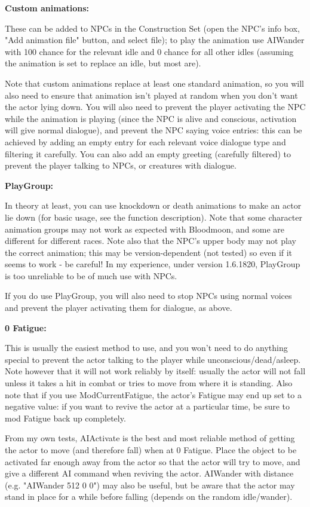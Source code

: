 \textbf{Custom animations:}

These can be added to NPCs in the Construction Set (open the NPC's info
box, "Add animation file" button, and select file); to play the
animation use AIWander with 100 chance for the relevant idle and 0
chance for all other idles (assuming the animation is set to replace an
idle, but most are).

Note that custom animations replace at least one standard animation, so
you will also need to ensure that animation isn't played at random when
you don't want the actor lying down. You will also need to prevent the
player activating the NPC while the animation is playing (since the NPC
is alive and conscious, activation will give normal dialogue), and
prevent the NPC saying voice entries: this can be achieved by adding an
empty entry for each relevant voice dialogue type and filtering it
carefully. You can also add an empty greeting (carefully filtered) to
prevent the player talking to NPCs, or creatures with dialogue.

\textbf{PlayGroup:}

In theory at least, you can use knockdown or death animations to make an
actor lie down (for basic usage, see the function description). Note
that some character animation groups may not work as expected with
Bloodmoon, and some are different for different races. Note also that
the NPC's upper body may not play the correct animation; this may be
version-dependent (not tested) so even if it seems to work - be careful!
In my experience, under version 1.6.1820, PlayGroup is too unreliable to
be of much use with NPCs.

If you do use PlayGroup, you will also need to stop NPCs using normal
voices and prevent the player activating them for dialogue, as above.

\textbf{0 Fatigue:}

This is usually the easiest method to use, and you won't need to do
anything special to prevent the actor talking to the player while
unconscious/dead/asleep. Note however that it will not work reliably by
itself: usually the actor will not fall unless it takes a hit in combat
or tries to move from where it is standing. Also note that if you use
ModCurrentFatigue, the actor's Fatigue may end up set to a negative
value: if you want to revive the actor at a particular time, be sure to
mod Fatigue back up completely.

From my own tests, AIActivate is the best and most reliable method of
getting the actor to move (and therefore fall) when at 0 Fatigue. Place
the object to be activated far enough away from the actor so that the
actor will try to move, and give a different AI command when reviving
the actor. AIWander with distance (e.g. "AIWander 512 0 0") may also be
useful, but be aware that the actor may stand in place for a while
before falling (depends on the random idle/wander).

